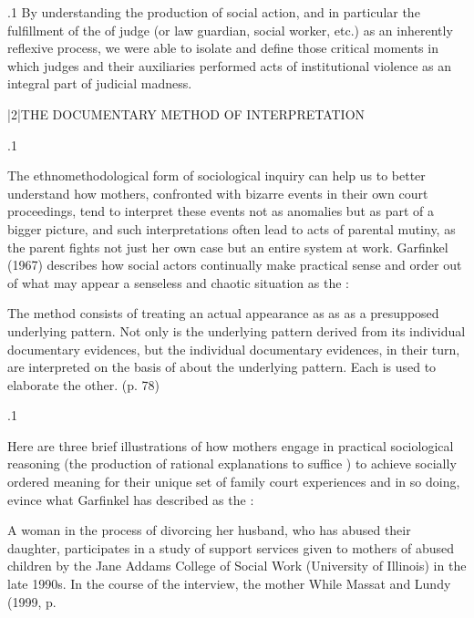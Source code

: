 \documentclass[11pt, twoside]{article}
\begin{document}
{\p.1{%
By understanding the production of social action, and in particular
the fulfillment of the  of judge (or law guardian, social worker,
etc.) as an inherently reflexive process, we were able to isolate and define
those critical moments in which judges and their auxiliaries performed
acts of institutional violence as an integral part of judicial madness.
}%


\s|2|{THE DOCUMENTARY METHOD OF INTERPRETATION}

\p.1{%
The ethnomethodological form of sociological inquiry can help us to
better understand how mothers, confronted with bizarre events in their
own court proceedings, tend to interpret these events not as anomalies
but as part of a bigger picture, and such interpretations often lead to acts
of parental mutiny, as the parent fights not just her own case but an entire
system at work. Garfinkel (1967) describes how social actors continually
make practical sense and order out of what may appear a senseless and
chaotic situation as the :

\begin{blockQuote}
The method consists of treating an actual appearance as  as  as  a presupposed
underlying pattern. Not only is the underlying pattern derived
from its individual documentary evidences, but the individual documentary evidences, in their turn, are interpreted on the basis of
 about the underlying pattern. Each is used to
elaborate the other. (p. 78)
\end{blockQuote}

}%

\p.1{%
Here are three brief illustrations of how mothers engage in practical
sociological reasoning (the production of rational explanations to suffice ) to achieve socially ordered meaning for
their unique set of family court experiences and in so doing, evince what
Garfinkel has described as the :

\begin{enumerate}

\enumsItem{}  A woman in the process of divorcing her husband, who has
abused their daughter, participates in a study of support
services given to mothers of abused children by the Jane
Addams College of Social Work (University of Illinois) in the
late 1990s. In the course of the interview, the mother  While Massat and Lundy (1999, p.


\end{enumerate}}}
\end{document}
